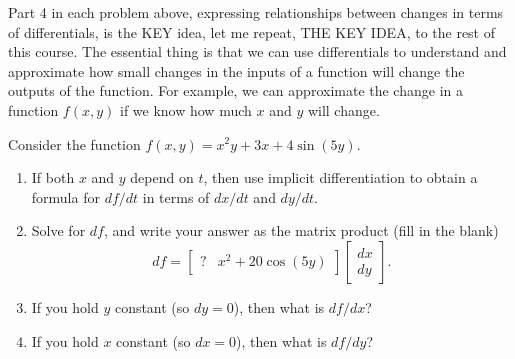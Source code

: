 %
Part 4 in each problem above, expressing relationships between changes in terms of differentials, is the KEY idea, let me repeat, THE KEY IDEA, to the rest of this course.  The essential thing is that we can use differentials to understand and approximate how small changes in the inputs of a function will change the outputs of the function.  For example, we can approximate the change in a function $f(x,y)$ if we know how much $x$ and $y$ will change.
\begin{problem}
 Consider the function $f(x,y) = x^2y +3x+4\sin(5y)$.  
\begin{enumerate}
 \item If both $x$ and $y$ depend on $t$, then use implicit differentiation to obtain a formula for $df/dt$ in terms of $dx/dt$ and $dy/dt$.
 \item Solve for $df$, and write your answer as the matrix product (fill in the blank) 
 $$df = \begin{bmatrix}?& x^2+20\cos(5y)\end{bmatrix}\begin{bmatrix}dx\\dy\end{bmatrix}.$$ 
 \item If you hold $y$ constant (so $dy=0$), then what is $df/dx$?  %
 \item If you hold $x$ constant (so $dx=0$), then what is $df/dy$?  %
\end{enumerate}
\end{problem}


